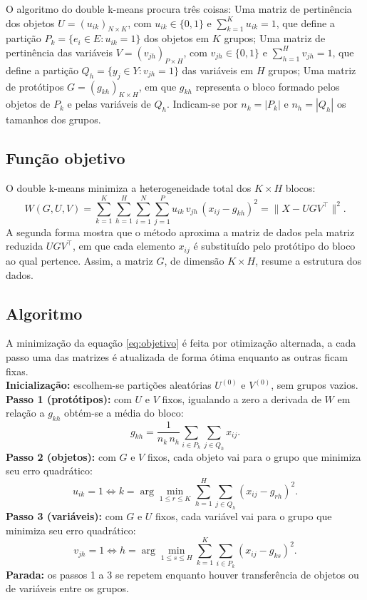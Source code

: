 \documentclass[12pt,reqno]{amsart}
\begin{document}
O algoritmo do double k-means procura três coisas: Uma matriz de pertinência dos objetos $U=(u_{ik})_{N\times K}$, com $u_{ik}\in\{0,1\}$ e
  $\sum_{k=1}^{K}u_{ik}=1$, que define a partição $P_k=\{e_i\in E: u_{ik}=1\}$ dos objetos em
  $K$ grupos; Uma matriz de pertinência das variáveis $V=(v_{jh})_{P\times H}$, com $v_{jh}\in\{0,1\}$ e
  $\sum_{h=1}^{H}v_{jh}=1$, que define a partição $Q_h=\{y_j\in Y: v_{jh}=1\}$ das variáveis em
  $H$ grupos; Uma matriz de protótipos $G=(g_{kh})_{K\times H}$, em que $g_{kh}$ representa o bloco
  formado pelos objetos de $P_k$ e pelas variáveis de $Q_h$. Indicam-se por $n_k=|P_k|$ e $n_h=|Q_h|$ os tamanhos dos grupos.

\subsection{Função objetivo}
O double k-means minimiza a heterogeneidade total dos $K\times H$ blocos:
\begin{equation}
W(G,U,V)=\sum_{k=1}^{K}\sum_{h=1}^{H}\sum_{i=1}^{N}\sum_{j=1}^{P}u_{ik}\,v_{jh}\,(x_{ij}-g_{kh})^2
=\|X-UGV^{\top}\|^2 .
\label{eq:objetivo}
\end{equation}
A segunda forma mostra que o método aproxima a matriz de dados pela matriz reduzida
$UGV^{\top}$, em que cada elemento $x_{ij}$ é substituído pelo protótipo do bloco ao qual
pertence. Assim, a matriz $G$, de dimensão $K\times H$, resume a estrutura dos dados.

\subsection{Algoritmo}
A minimização da equação \eqref{eq:objetivo} é feita por otimização alternada, a cada passo uma das
matrizes é atualizada de forma ótima enquanto as outras ficam fixas. \\
\textbf{Inicialização:} escolhem-se partições aleatórias $U^{(0)}$ e $V^{(0)}$, sem
  grupos vazios.
\textbf{Passo 1 (protótipos):} com $U$ e $V$ fixos, igualando a zero a derivada de $W$ em
  relação a $g_{kh}$ obtém-se a média do bloco:
  \[
  g_{kh}=\frac{1}{n_k\,n_h}\sum_{i\in P_k}\sum_{j\in Q_h}x_{ij}.
  \]
\textbf{Passo 2 (objetos):} com $G$ e $V$ fixos, cada objeto vai para o grupo que
  minimiza seu erro quadrático:
  \[
  u_{ik}=1 \iff k=\arg\min_{1\le r\le K}\sum_{h=1}^{H}\sum_{j\in Q_h}(x_{ij}-g_{rh})^2 .
  \]
\textbf{Passo 3 (variáveis):} com $G$ e $U$ fixos, cada variável vai para o grupo que
  minimiza seu erro quadrático:
  \[
  v_{jh}=1 \iff h=\arg\min_{1\le s\le H}\sum_{k=1}^{K}\sum_{i\in P_k}(x_{ij}-g_{ks})^2 .
  \]
\textbf{Parada:} os passos 1 a 3 se repetem enquanto houver transferência de objetos ou
  de variáveis entre os grupos.
\end{document}
